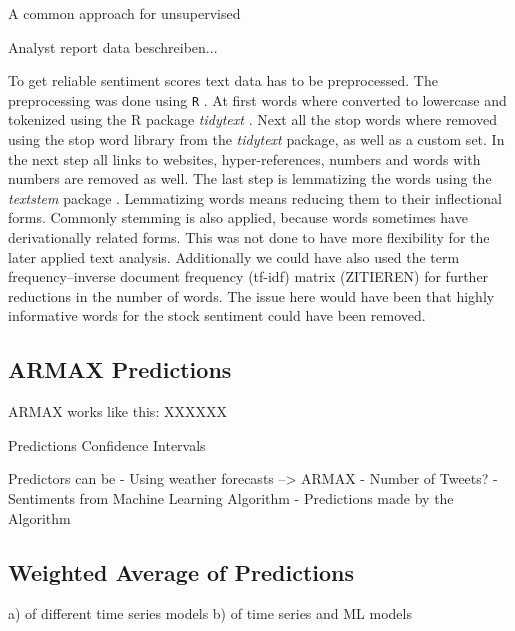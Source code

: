 A common approach for unsupervised 


Analyst report data beschreiben...

To get reliable sentiment scores text data has to be preprocessed. The preprocessing was done using \texttt{R} \citep{Rproject}. At first words where converted to lowercase and tokenized using the R package \textit{tidytext} \citep{tidytext}. Next all the stop words where removed using the stop word library from the \textit{tidytext} package, as well as a custom set. In the next step all links to websites, hyper-references, numbers and words with numbers are removed as well. 
The last step is lemmatizing the words using the \textit{textstem} package \citep{textstem}. Lemmatizing words means reducing them to their inflectional forms. Commonly stemming is also applied, because words sometimes have derivationally related forms. This was not done to have more flexibility for the later applied text analysis. Additionally we could have also used the term frequency–inverse document frequency (tf-idf) matrix (ZITIEREN) for further reductions in the number of words. The issue here would have been that highly informative words for the stock sentiment could have been removed. 

\subsection{ARMAX Predictions}
ARMAX works like this: 
XXXXXX

Predictions
Confidence Intervals


Predictors can be 
- Using weather forecasts --> ARMAX
- Number of Tweets?
- Sentiments from Machine Learning Algorithm
- Predictions made by the Algorithm



\subsection{Weighted Average of Predictions}
a) of different time series models
b) of time series and ML models
